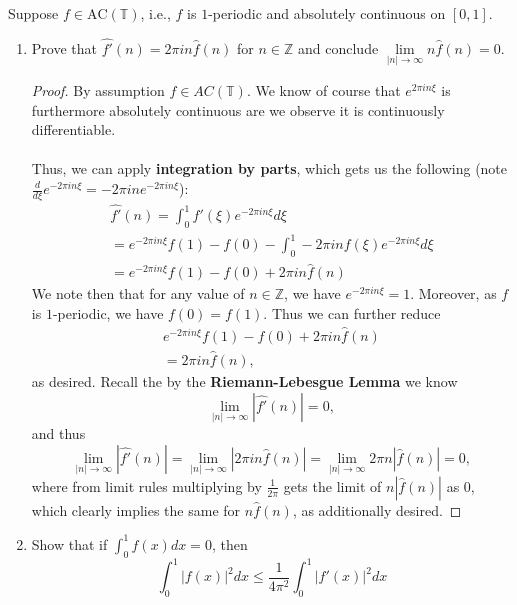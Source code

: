 \documentclass[12pt]{article}
\newenvironment{ex}[2][Exercise]{\begin{trivlist}
\item[\hskip \labelsep {\bfseries #1}\hskip \labelsep {\bfseries #2.}]}{\end{trivlist}}
\begin{document}
\begin{ex}{6}
    Suppose $f \in \text{AC}(\mathbb{T})$, i.e., $f$ is $1$-periodic and absolutely continuous on $[0,1]$.
    \begin{enumerate}[label=6.\arabic*]
        \item Prove that $\hat{f'}(n) = 2\pi in\hat{f}(n)$ for $n \in \mathbb{Z}$ and conclude $\underset{|n| \rightarrow \infty}{\lim} n\hat{f}(n) = 0$.
        \begin{proof}
            By assumption $f \in AC(\mathbb{T})$. We know of course that $e^{2\pi in\xi}$ is furthermore absolutely continuous are we observe it is continuously differentiable. \\ \\
            Thus, we can apply \textbf{integration by parts}, which gets us the following (note $\frac{d}{d\xi} e^{-2\pi in\xi} = -2\pi ine^{-2\pi in\xi}$):
            \begin{align*}
                \hat{f'}(n) = \int_0^1 f'(\xi) e^{-2\pi i n\xi} d\xi \\
                = e^{-2\pi in\xi}f(1) - f(0) - \int_0^1 -2\pi in f(\xi)e^{-2\pi in \xi} d\xi \\
                = e^{-2\pi in\xi}f(1) - f(0) + 2\pi i n \hat{f}(n)
            \end{align*}
            We note then that for any value of $n \in \mathbb{Z}$, we have $e^{-2\pi in\xi} = 1$. Moreover, as $f$ is $1$-periodic, we have $f(0) = f(1)$. Thus we can further reduce 
            \begin{align*}
                e^{-2\pi in\xi}f(1) - f(0) + 2\pi i n \hat{f}(n) \\
                = 2\pi in\hat{f}(n),
            \end{align*}
            as desired. Recall the by the \textbf{Riemann-Lebesgue Lemma} we know 
            $$\underset{|n| \rightarrow \infty}{\lim} |\hat{f'}(n)| = 0,$$
            and thus 
            $$\underset{|n| \rightarrow \infty}{\lim} |\hat{f'}(n)| = \underset{|n| \rightarrow \infty}{\lim} |2\pi i n \hat{f}(n)| = \underset{|n| \rightarrow \infty}{\lim} 2\pi n |\hat{f}(n)| = 0,$$
            where from limit rules multiplying by $\frac{1}{2\pi}$ gets the limit of $n|\hat{f}(n)|$ as $0$, which clearly implies the same for $n\hat{f}(n)$, as additionally desired.
        \end{proof}
        \item Show that if $\int_0^1 f(x) dx = 0$, then 
        $$\int_0^1 |f(x)|^2 dx \leq \frac{1}{4\pi^2} \int_0^1 |f'(x)|^2 dx$$
    \end{enumerate}
\end{ex}
\end{document}

